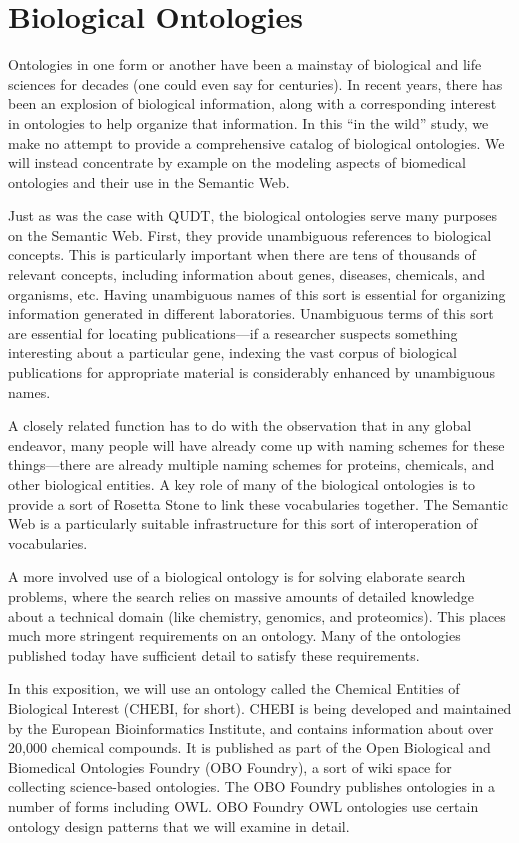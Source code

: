 \section{Biological Ontologies}
\label{section:Bio}

Ontologies in one form or another have been a mainstay of biological and
life sciences for decades (one could even say for centuries). In recent
years, there has been an explosion of biological information, along with
a corresponding interest in ontologies to help organize that
information. In this ``in the wild'' study, we make no attempt to
provide a comprehensive catalog of biological ontologies. We will
instead concentrate by example on the modeling aspects of biomedical
ontologies and their use in the Semantic Web.

Just as was the case with QUDT, the biological ontologies serve many
purposes on the Semantic Web. First, they provide unambiguous references
to biological concepts. This is particularly important when there are
tens of thousands of relevant concepts, including information about
genes, diseases, chemicals, and organisms, etc. Having unambiguous names
of this sort is essential for organizing information generated in
different laboratories. Unambiguous terms of this sort are essential for
locating publications---if a researcher suspects something interesting
about a particular gene, indexing the vast corpus of biological
publications for appropriate material is considerably enhanced by
unambiguous names.

A closely related function has to do with the observation that in any
global endeavor, many people will have already come up with naming
schemes for these things---there are already multiple naming schemes for
proteins, chemicals, and other biological entities. A key role of many
of the biological ontologies is to provide a sort of Rosetta Stone to
link these vocabularies together. The Semantic Web is a particularly
suitable infrastructure for this sort of interoperation of vocabularies.

A more involved use of a biological ontology is for solving elaborate
search problems, where the search relies on massive amounts of detailed
knowledge about a technical domain (like chemistry, genomics, and
proteomics). This places much more stringent requirements on an
ontology. Many of the ontologies published today have sufficient detail
to satisfy these requirements.

In this exposition, we will use an ontology called the Chemical Entities
of Biological Interest (CHEBI, for short). CHEBI is being developed and
maintained by the European Bioinformatics Institute, and contains
information about over 20,000 chemical compounds. It is published as
part of the Open Biological and Biomedical Ontologies Foundry (OBO
Foundry), a sort of wiki space for collecting science-based ontologies.
The OBO Foundry publishes ontologies in a number of forms including OWL.
OBO Foundry OWL ontologies use certain ontology design patterns that we
will examine in detail.

